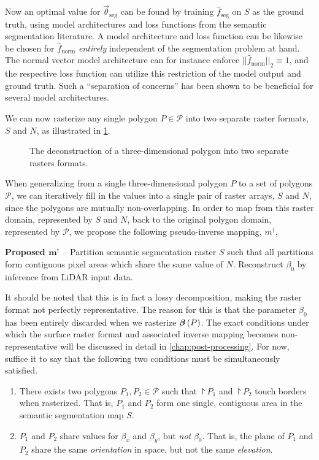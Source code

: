 Now an optimal value for $\vec{\theta}_{\mathrm{seg}}$ can be found by training $\hat{f}_{\mathrm{seg}}$ on $S$ as the ground truth, using model architectures and loss functions from the semantic segmentation literature.
A model architecture and loss function can be likewise be chosen for $\hat{f}_{\mathrm{norm}}$ \emph{entirely} independent of the segmentation problem at hand.
The normal vector model architecture can for instance enforce $||\hat{f}_{\mathrm{norm}}||_2 \equiv 1$, and the respective loss function can utilize this restriction of the model output and ground truth.
Such a \enquote{separation of concerns} has been shown to be beneficial for several model architectures.

We can now rasterize any single polygon $P \in \mathcal{P}$ into two separate raster formats, $S$ and $N$, as illustrated in \cref{fig:3d-polygon-decomposition}.
\begin{figure}
  \centering
  \caption{The deconstruction of a three-dimensional polygon into two separate rasters formats.}%
  \label{fig:3d-polygon-decomposition}
\end{figure}
When generalizing from a single three-dimensional polygon $P$ to a set of polygons $\mathcal{P}$, we can iteratively fill in the values into a single pair of raster arrays, $S$ and $N$, since the polygons are mutually non-overlapping.
In order to map from this raster domain, represented by $S$ and $N$, back to the original polygon domain, represented by $\mathcal{P}$, we propose the following pseudo-inverse mapping, $m^{\dagger}$,
\begin{framed}
  \noindent
  \textbf{Proposed $\mathbf{m^{\dagger}}$} -- Partition semantic segmentation raster $S$ such that all partitions form contiguous pixel areas which share the same value of $N$.
  Reconstruct $\beta_0$ by inference from LiDAR input data.
\end{framed}
\noindent
It should be noted that this is in fact a lossy decomposition, making the raster format not perfectly representative.
The reason for this is that the parameter $\beta_0$ has been entirely discarded when we rasterize $\boldsymbol{\beta}\left(P\right)$.
The exact conditions under which the surface raster format and associated inverse mapping becomes non-representative will be discussed in detail in \cref{chap:post-processing}.
For now, suffice it to say that the following two conditions must be simultaneously satisfied.
\begin{enumerate}
  \item There exists two polygons $P_1, P_2 \in \mathcal{P}$ such that $\project{P_1}$ and $\project{P_2}$ touch borders when rasterized.
    That is, $P_1$ and $P_2$ form one single, contiguous area in the semantic segmentation map $S$.
  \item $P_1$ and $P_2$ share values for $\beta_x$ and $\beta_y$, but \emph{not} $\beta_0$.
    That is, the plane of $P_1$ and $P_2$ share the same \textit{orientation} in space, but not the same \textit{elevation}.
\end{enumerate}
